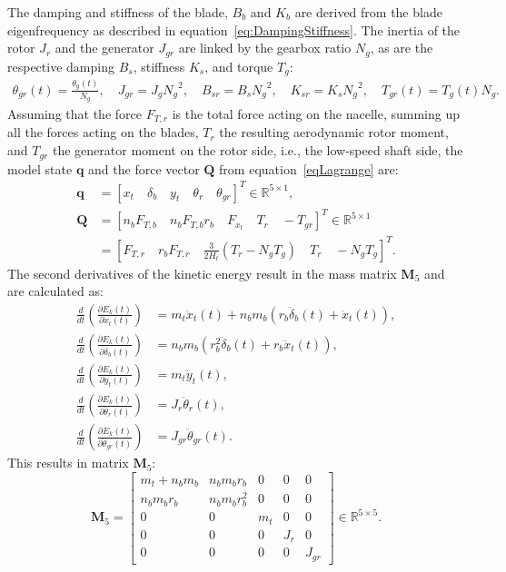 The damping and stiffness of the blade, $B_b$ and $K_b$ are derived from the blade eigenfrequency as described in equation~\eqref{eq:DampingStiffness}. %
The inertia of the rotor \(J_r\) and the generator \(J_{gr}\) are linked by the gearbox ratio \(N_g\), as are the respective damping \(B_s\), stiffness \(K_s\), and torque \(T_g\):
\begin{align*}
    \theta_{gr}(t) = \frac{\theta_{g}(t)}{N_g}, \quad J_{gr} = J_{g}{N_g}^2, \quad
    B_{sr} = B_{s}{N_g}^2, \quad K_{sr} = K_{s}{N_g}^2, \quad T_{gr}(t) = T_{g}(t)N_g.
\end{align*}
%
Assuming that the force \(F_{T,r}\) is the total force acting on the nacelle, summing up all the forces acting on the blades, $T_r$ the resulting aerodynamic rotor moment, and $T_{gr}$ the generator moment on the rotor side, i.e., the low-speed shaft side, the model state \(\bm{q}\) and the force vector \(\mathbf{Q}\) from equation~\eqref{eqLagrange} are:
\begin{align*}
    \bm{q}& = [x_t \quad \delta_b \quad y_t \quad \theta_r \quad \theta_{gr}]^T  \in \mathbb{R}^{5 \times 1},\\
    \mathbf{Q} & = [n_b F_{T,b} \quad n_b F_{T,b}r_b \quad F_{x_t} \quad T_r \quad -T_{gr}]^T \in \mathbb{R}^{5 \times 1}\\
    & = [F_{T,r} \quad r_bF_{T,r} \quad \frac{3}{2H_t}(T_r - N_g T_g)\quad T_r \quad -N_g T_g]^T.
\end{align*}
The second derivatives of the kinetic energy result in the mass matrix \(\mathbf{M}_5\) and are calculated as:
\begin{align*}
    \frac{d}{dt} \left(\frac{\partial E_k(t)}{\partial \dot{x}_t(t)} \right) &= m_t\ddot{x}_t(t) + n_b m_b(r_b\ddot{\delta}_b(t) + \ddot{x}_t(t)), \\
    \frac{d}{dt} \left(\frac{\partial E_k(t)}{\partial \dot{\delta}_b(t)} \right) &= n_b m_b(r_b^2\ddot{\delta}_b(t) + r_b\ddot{x}_t(t)), \\
    \frac{d}{dt} \left(\frac{\partial E_k(t)}{\partial \dot{y}_t(t)} \right) &= m_t\ddot{y}_t(t), \\
    \frac{d}{dt} \left(\frac{\partial E_k(t)}{\partial \dot{\theta}_r(t)} \right) &= J_r\ddot{\theta}_r(t), \\
    \frac{d}{dt} \left(\frac{\partial E_k(t)}{\partial \dot{\theta}_{gr}(t)} \right) &= J_{gr}\ddot{\theta}_{gr}(t).
\end{align*}
This results in matrix $\mathbf{M}_5$:
\[
\mathbf{M}_5 = \begin{bmatrix}
    m_t + n_b m_b & n_b m_b r_b & 0 & 0 & 0 \\
    n_b m_b r_b & n_b m_b r_b^2 & 0 & 0 & 0 \\
    0 & 0 & m_t & 0 & 0 \\
    0 & 0 & 0 & J_r & 0 \\
    0 & 0 & 0 & 0 & J_{gr}
\end{bmatrix}  \in \mathbb{R}^{5 \times 5}.
\]

